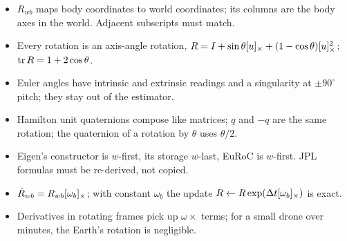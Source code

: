 \begin{takeaways}
\begin{itemize}
  \item $R_{wb}$ maps body coordinates to world coordinates; its columns are the body axes in the world. Adjacent subscripts must match.
  \item Every rotation is an axis-angle rotation, $R = I + \sin\theta[u]_{\times} + (1-\cos\theta)[u]_{\times}^2$; $\operatorname{tr} R = 1 + 2\cos\theta$.
  \item Euler angles have intrinsic and extrinsic readings and a singularity at $\pm90^\circ$ pitch; they stay out of the estimator.
  \item Hamilton unit quaternions compose like matrices; $q$ and $-q$ are the same rotation; the quaternion of a rotation by $\theta$ uses $\theta/2$.
  \item Eigen's constructor is $w$-first, its storage $w$-last, EuRoC is $w$-first. JPL formulas must be re-derived, not copied.
  \item $\dot R_{wb} = R_{wb}[\omega_b]_{\times}$; with constant $\omega_b$ the update $R \leftarrow R\exp({\Delta t}[\omega_b]_{\times})$ is exact.
  \item Derivatives in rotating frames pick up $\omega\times$ terms; for a small drone over minutes, the Earth's rotation is negligible.
\end{itemize}
\end{takeaways}

